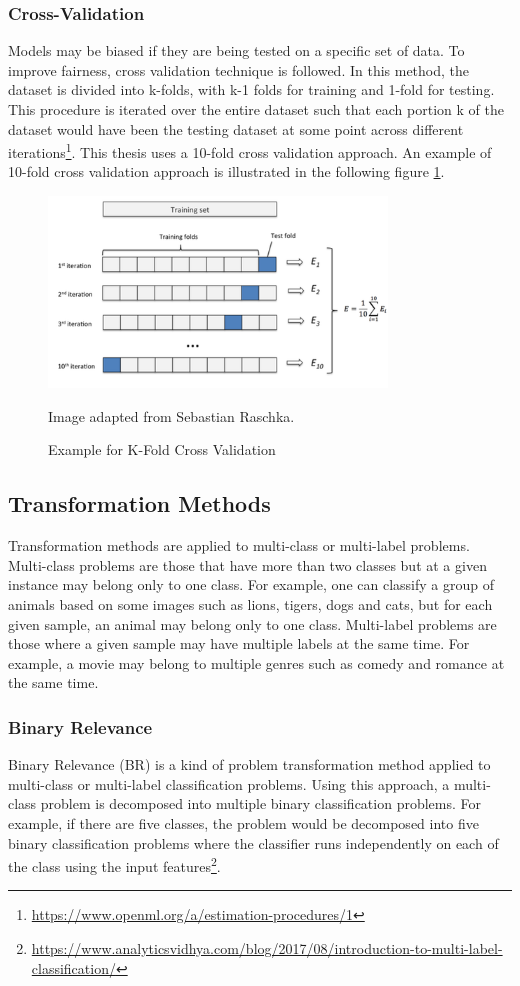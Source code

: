 \documentclass[a4paper,12pt,twoside]{report}
\begin{document}
\subsubsection{Cross-Validation} 
Models may be biased if they are being tested on a specific set of data. To improve fairness, cross validation technique is followed. In this method, the dataset is divided into k-folds, with k-1 folds for training and 1-fold for testing. This procedure is iterated over the entire dataset such that each portion k of the dataset would have been the testing dataset at some point across different iterations\footnote{\url{https://www.openml.org/a/estimation-procedures/1}}. This thesis uses a 10-fold cross validation approach. An example of 10-fold cross validation approach is illustrated in the following figure \ref{fig:k-fold}.
\begin{figure}[h] %
    \centering
    \includegraphics[width=9cm]{k-fold}
    \caption{Example for K-Fold Cross Validation}
    \small Image adapted from Sebastian Raschka\footnotemark.
    \label{fig:k-fold}
\end{figure}

\subsection{Transformation Methods}
Transformation methods are applied to multi-class or multi-label problems. Multi-class problems are those that have more than two classes but at a given instance may belong only to one class. For example, one can classify a group of animals based on some images such as lions, tigers, dogs and cats, but for each given sample, an animal may belong only to one class. Multi-label problems are those where a given sample may have multiple labels at the same time. For example, a movie may belong to multiple genres such as comedy and romance at the same time. 

\subsubsection{Binary Relevance} 
Binary Relevance (BR) is a kind of problem transformation method applied to multi-class or multi-label classification problems. Using this approach, a multi-class problem is decomposed into multiple binary classification problems. For example, if there are five classes, the problem would be decomposed into five binary classification problems where the classifier runs independently on each of the class using the input features\footnote{\url{https://www.analyticsvidhya.com/blog/2017/08/introduction-to-multi-label-classification/}}. 
\end{document}
